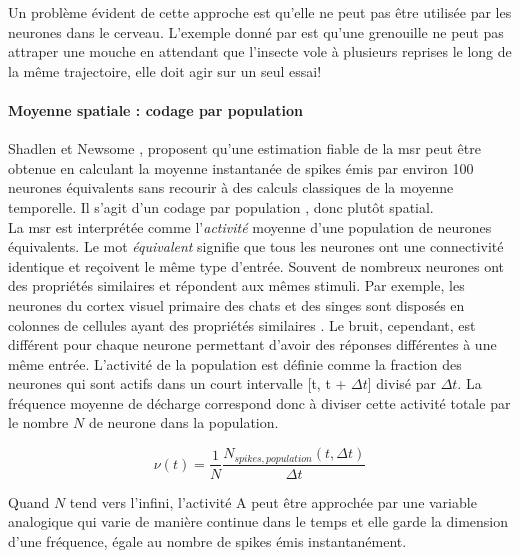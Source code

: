 Un problème évident de cette approche est qu'elle ne peut pas être utilisée par les neurones dans le cerveau. L'exemple donné par \cite{Gerstner:2002} est qu'une grenouille ne peut pas attraper une mouche en attendant que l'insecte vole à plusieurs reprises le long de la même trajectoire, elle doit agir sur un seul essai!\\

\paragraph{Moyenne spatiale : codage par population }

Shadlen et Newsome \cite{Shadlen:1994}, proposent qu'une estimation fiable de la \gls{msr} peut être obtenue en calculant la moyenne instantanée de spikes émis par environ 100 neurones équivalents sans recourir à des calculs classiques de la moyenne temporelle. Il s'agit d'un codage par population \cite{Wu:2002}, donc plutôt spatial.\\

La \gls{msr} est interprétée comme l'\textit{activité} moyenne d'une population de neurones équivalents. Le mot \textit{équivalent} signifie que tous les neurones ont une connectivité identique et reçoivent le même type d'entrée. Souvent de nombreux neurones ont des propriétés similaires et répondent aux mêmes stimuli. Par exemple, les neurones du cortex visuel primaire des chats et des singes sont disposés en colonnes de cellules ayant des propriétés similaires \cite{Hubel:1988, Hubel:1962, Hubel:1977}. Le bruit, cependant, est différent pour chaque neurone permettant d'avoir des réponses différentes à une même entrée. L'activité de la population est définie comme la fraction des neurones qui sont actifs dans un court intervalle [t, t + $ \Delta t$] divisé par $\Delta t$. La fréquence moyenne de décharge correspond donc à diviser cette activité totale par le nombre $N$ de neurone dans la population. 

\begin{center}
\begin{equation} 
\nu(t) =\frac{1}{N} \frac{N_ {spikes,population} (t,\Delta t) }{\Delta t} 
 \end{equation}
\end{center}

Quand $N$ tend vers l'infini, l'activité A peut être approchée par une variable analogique qui varie de manière continue dans le temps et elle garde la dimension d'une fréquence, égale au nombre de spikes émis instantanément.\\

